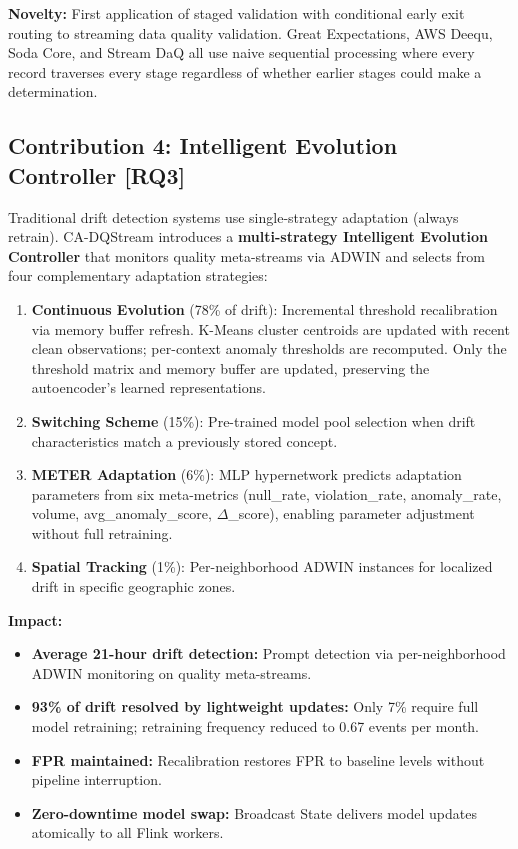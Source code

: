 \textbf{Novelty:} First application of staged validation with conditional early exit routing to streaming data quality validation. Great Expectations, AWS Deequ, Soda Core, and Stream DaQ all use naive sequential processing where every record traverses every stage regardless of whether earlier stages could make a determination.

\subsection{Contribution 4: Intelligent Evolution Controller [RQ3]}

Traditional drift detection systems use single-strategy adaptation (always retrain). CA-DQStream introduces a \textbf{multi-strategy Intelligent Evolution Controller} that monitors quality meta-streams via ADWIN and selects from four complementary adaptation strategies:

\begin{enumerate}
    \item \textbf{Continuous Evolution} (78\% of drift): Incremental threshold recalibration via memory buffer refresh. K-Means cluster centroids are updated with recent clean observations; per-context anomaly thresholds are recomputed. Only the threshold matrix and memory buffer are updated, preserving the autoencoder's learned representations.
    \item \textbf{Switching Scheme} (15\%): Pre-trained model pool selection when drift characteristics match a previously stored concept.
    \item \textbf{METER Adaptation} (6\%): MLP hypernetwork predicts adaptation parameters from six meta-metrics (null\_rate, violation\_rate, anomaly\_rate, volume, avg\_anomaly\_score, $\Delta$\_score), enabling parameter adjustment without full retraining.
    \item \textbf{Spatial Tracking} (1\%): Per-neighborhood ADWIN instances for localized drift in specific geographic zones.
\end{enumerate}

\textbf{Impact:}
\begin{itemize}
    \item \textbf{Average 21-hour drift detection:} Prompt detection via per-neighborhood ADWIN monitoring on quality meta-streams.
    \item \textbf{93\% of drift resolved by lightweight updates:} Only 7\% require full model retraining; retraining frequency reduced to 0.67 events per month.
    \item \textbf{FPR maintained:} Recalibration restores FPR to baseline levels without pipeline interruption.
    \item \textbf{Zero-downtime model swap:} Broadcast State delivers model updates atomically to all Flink workers.
\end{itemize}

